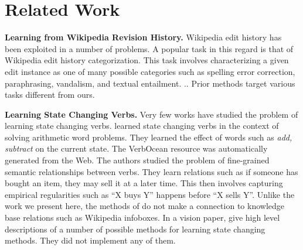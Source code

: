 \section{Related Work}

\textbf{Learning from Wikipedia Revision History.}
Wikipedia edit history has been exploited in a number of problems.
  A popular task in this regard is that of
Wikipedia edit history categorization\cite{daxenberger2013automatically}.  This task
involves characterizing  a given edit instance as one of many possible categories 
such as spelling error correction, paraphrasing, vandalism,  and textual entailment. \cite{Nelken08miningwikipedia,Cahill13robustsystems,Zanzotto_expandingtextual,RecasensDJ13}.. 
Prior methods target various tasks different from ours.

\textbf{Learning State Changing Verbs.}
Very few works have studied the problem of learning state changing verbs.
\cite{HosseiniHEK14} learned state changing verbs in the context of solving arithmetic word problems.
They learned the effect of  words such as \textit{add, subtract} on  the current state. 
The VerbOcean resource was automatically generated from the Web\cite{Chklovski04}. The authors  studied the problem of fine-grained semantic relationships between verbs. They learn relations such as  if someone has bought an item, they may sell it at a later time. This then involves capturing empirical regularities such as  ``X buys Y'' happens before ``X
sells Y''. Unlike the work we present here, the methods of \cite{Chklovski04,HosseiniHEK14}  do not make a connection to knowledge base relations such as Wikipedia infoboxes.
In a vision paper, \cite{Wijaya2014akbc} give high level descriptions of  a number of possible methods for learning state changing methods. They  did not implement any of them.
